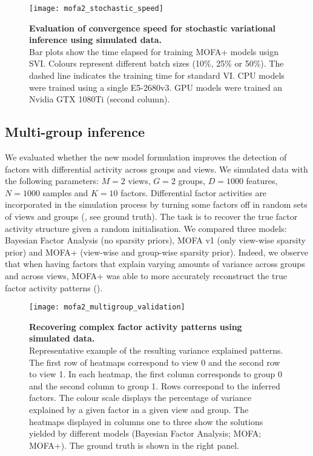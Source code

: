 \begin{figure}[H]
	\centering
	\texttt{[image: mofa2\_stochastic\_speed]}
	\caption[]{
	\textbf{Evaluation of convergence speed for stochastic variational inference using simulated data.} \\
	Bar plots show the time elapsed for training MOFA+ models usign SVI. Colours represent different batch sizes (10\%, 25\% or 50\%). The dashed line indicates the training time for standard VI. CPU models were trained using a single E5-2680v3. GPU models were trained an Nvidia GTX 1080Ti (second column). 
	}
	\label{fig:mofa2_stochastic_speed}
\end{figure}



\subsection{Multi-group inference}

We evaluated whether the new model formulation improves the detection of factors with differential activity across groups and views. We simulated data with the following parameters: $M=2$ views, $G=2$ groups, $D=1000$ features, $N=1000$ samples and $K=10$ factors. Differential factor activities are incorporated in the simulation process by turning some factors off in random sets of views and groups (, see ground truth). The task is to recover the true factor activity structure given a random initialisation. We compared three models: Bayesian Factor Analysis (no sparsity priors), MOFA v1 (only view-wise sparsity prior) and MOFA+ (view-wise and group-wise sparsity prior). Indeed, we observe that when having factors that explain varying amounts of variance across groups and across views, MOFA+ was able to more accurately reconstruct the true factor activity patterns ().

\begin{figure}[H]
	\centering
	\texttt{[image: mofa2\_multigroup\_validation]}
	\caption[]{
	\textbf{Recovering complex factor activity patterns using simulated data.} \\
	Representative example of the resulting variance explained patterns. The first row of heatmaps correspond to view 0 and the second row to view 1. In each heatmap, the first column corresponds to group 0 and the second column to group 1. Rows correspond to the inferred factors. The colour scale displays the percentage of variance explained by a given factor in a given view and group. The heatmaps displayed in columns one to three show the solutions yielded by different models (Bayesian Factor Analysis; MOFA; MOFA+). The ground truth is shown in the right panel. 
	}
	\label{fig:mofa2_multigroup_validation}
\end{figure}



